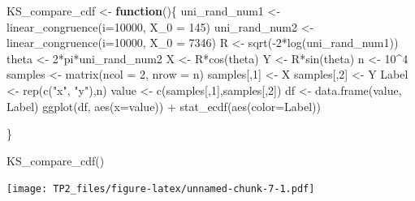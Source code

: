 \documentclass[
]{article}
\newenvironment{Shaded}{\begin{snugshade}}{\end{snugshade}}
\newcommand{\AttributeTok}[1]{\textcolor[rgb]{0.77,0.63,0.00}{#1}}
\newcommand{\ControlFlowTok}[1]{\textcolor[rgb]{0.13,0.29,0.53}{\textbf{#1}}}
\newcommand{\DecValTok}[1]{\textcolor[rgb]{0.00,0.00,0.81}{#1}}
\newcommand{\FunctionTok}[1]{\textcolor[rgb]{0.00,0.00,0.00}{#1}}
\newcommand{\NormalTok}[1]{#1}
\newcommand{\OtherTok}[1]{\textcolor[rgb]{0.56,0.35,0.01}{#1}}
\newcommand{\SpecialCharTok}[1]{\textcolor[rgb]{0.00,0.00,0.00}{#1}}
\newcommand{\StringTok}[1]{\textcolor[rgb]{0.31,0.60,0.02}{#1}}
\begin{document}
\begin{Shaded}
\begin{Highlighting}[]
\NormalTok{KS\_compare\_cdf }\OtherTok{\textless{}{-}} \ControlFlowTok{function}\NormalTok{()\{}
\NormalTok{  uni\_rand\_num1 }\OtherTok{\textless{}{-}} \FunctionTok{linear\_congruence}\NormalTok{(}\AttributeTok{i=}\DecValTok{10000}\NormalTok{, }\AttributeTok{X\_0 =} \DecValTok{145}\NormalTok{)}
\NormalTok{  uni\_rand\_num2 }\OtherTok{\textless{}{-}} \FunctionTok{linear\_congruence}\NormalTok{(}\AttributeTok{i=}\DecValTok{10000}\NormalTok{, }\AttributeTok{X\_0 =} \DecValTok{7346}\NormalTok{)}
\NormalTok{  R }\OtherTok{\textless{}{-}} \FunctionTok{sqrt}\NormalTok{(}\SpecialCharTok{{-}}\DecValTok{2}\SpecialCharTok{*}\FunctionTok{log}\NormalTok{(uni\_rand\_num1))}
\NormalTok{  theta }\OtherTok{\textless{}{-}} \DecValTok{2}\SpecialCharTok{*}\NormalTok{pi}\SpecialCharTok{*}\NormalTok{uni\_rand\_num2}
\NormalTok{  X }\OtherTok{\textless{}{-}}\NormalTok{ R}\SpecialCharTok{*}\FunctionTok{cos}\NormalTok{(theta)}
\NormalTok{  Y }\OtherTok{\textless{}{-}}\NormalTok{ R}\SpecialCharTok{*}\FunctionTok{sin}\NormalTok{(theta)}
\NormalTok{  n }\OtherTok{\textless{}{-}} \DecValTok{10}\SpecialCharTok{\^{}}\DecValTok{4}
\NormalTok{  samples }\OtherTok{\textless{}{-}} \FunctionTok{matrix}\NormalTok{(}\AttributeTok{ncol =} \DecValTok{2}\NormalTok{, }\AttributeTok{nrow =}\NormalTok{ n)}
\NormalTok{  samples[,}\DecValTok{1}\NormalTok{] }\OtherTok{\textless{}{-}}\NormalTok{ X}
\NormalTok{  samples[,}\DecValTok{2}\NormalTok{] }\OtherTok{\textless{}{-}}\NormalTok{ Y }
\NormalTok{  Label }\OtherTok{\textless{}{-}} \FunctionTok{rep}\NormalTok{(}\FunctionTok{c}\NormalTok{(}\StringTok{"x"}\NormalTok{, }\StringTok{"y"}\NormalTok{),n)}
\NormalTok{  value }\OtherTok{\textless{}{-}} \FunctionTok{c}\NormalTok{(samples[,}\DecValTok{1}\NormalTok{],samples[,}\DecValTok{2}\NormalTok{])}
\NormalTok{  df }\OtherTok{\textless{}{-}} \FunctionTok{data.frame}\NormalTok{(value, Label)}
  \FunctionTok{ggplot}\NormalTok{(df, }\FunctionTok{aes}\NormalTok{(}\AttributeTok{x=}\NormalTok{value)) }\SpecialCharTok{+} \FunctionTok{stat\_ecdf}\NormalTok{(}\FunctionTok{aes}\NormalTok{(}\AttributeTok{color=}\NormalTok{Label))}

\NormalTok{\}}

\FunctionTok{KS\_compare\_cdf}\NormalTok{()}
\end{Highlighting}
\end{Shaded}

\texttt{[image: TP2\_files/figure-latex/unnamed-chunk-7-1.pdf]}
\end{document}
